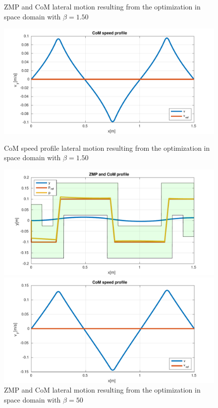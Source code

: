 \documentclass[a4paper]{article}
\begin{document}
\begin{figure}
\begin{minipage}[b]{0.48\textwidth}
         \caption{ZMP and CoM lateral motion resulting from the optimization in space domain with $\beta=1.50$ } 
         \label{fig:opt_y_150_space}
     \end{minipage}
     \hfill
     \begin{minipage}[b]{0.48\textwidth}
         \centering
        \includegraphics[scale=0.4]{plot/optimization/opt_vy_150_space.pdf}
        \caption{CoM speed profile lateral motion resulting from the optimization in space domain with $\beta=1.50$} 
        \label{fig:opt_y_50_space}
     \end{minipage} 
     \vfill
     \begin{minipage}[b]{0.48\textwidth}
         \centering
       \includegraphics[scale=0.4]{plot/optimization/opt_y_50_space.pdf}
         \caption{ZMP and CoM lateral motion resulting from the optimization in space domain with $\beta=50$ } 
         \label{fig:opt_y_150_space}
     \end{minipage}
     \hfill
     \begin{minipage}[b]{0.48\textwidth}
         \centering
        \includegraphics[scale=0.4]{plot/optimization/opt_vy_50_space.pdf}

\end{minipage}
\end{figure}
\end{document}
